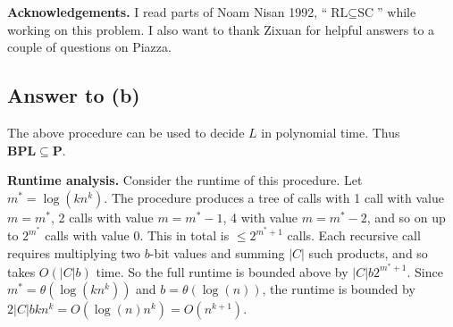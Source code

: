 \documentclass{article}
\renewcommand{\P}{\mathbf{P}}
\def \BPL{{\mathbf{BPL}}}
\begin{document}





\medskip
\noindent \textbf{Acknowledgements.}  I read parts of Noam Nisan 1992, ``$\text{RL} \subseteq \text{SC}$'' while working on this problem.
I also want to thank Zixuan for helpful answers to a couple of questions on Piazza.

\newpage
\subsection*{Answer to (b)}

The above procedure can be used to decide $L$ in polynomial time.  Thus $\BPL \subseteq \P$.

\medskip
\noindent \textbf{Runtime analysis.}
Consider the runtime of this procedure.
Let $m^* = \log(kn^k)$.
The procedure produces a tree of calls with 1 call with value $m = m^*$, 2 calls with value $m = m^*-1$, 4 with value $m = m^*-2$, and so on up to $2^{m^*}$ calls with value 0.
This in total is $\leq 2^{m^*+1}$ calls.
Each recursive call requires multiplying two $b$-bit values and summing $|C|$ such products, and so takes $O(|C|b)$ time.
So the full runtime is bounded above by $|C|b2^{m^*+1}$.
Since $m^* = \theta(\log (k n^k))$ and $b = \theta(\log(n))$, the runtime is bounded by $2|C|bk n^k = O(\log(n)n^k) = O(n^{k+1})$.

\end{document}
